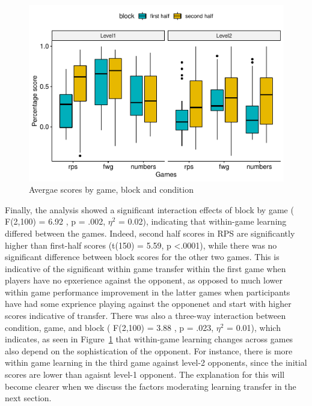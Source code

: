 \documentclass[man,floatsintext]{apa6}
\begin{document}
\begin{figure}

{\centering \includegraphics{draft_report_v1_files/figure-latex/exp1-3factor-plot-1} 

}

\caption{Avergae scores by game, block and condition}\label{fig:exp1-3factor-plot}
\end{figure}

Finally, the analysis showed a significant interaction effects of block by game ( F(2,100) = 6.92 , p = .002, \(\eta^{2}\) = 0.02), indicating that within-game learning differed between the games. Indeed, second half scores in RPS are significantly higher than first-half scores (t(150) = 5.59, p \textless{}.0001), while there was no significant difference between block scores for the other two games. This is indicative of the significant within game transfer within the first game when players have no epxerience against the opponent, as opposed to much lower within game performance improvement in the latter games when participants have had some exprience playing against the opponenet and start with higher scores indicative of transfer. There was also a three-way interaction between condition, game, and block ( F(2,100) = 3.88 , p = .023, \(\eta^{2}\) = 0.01), which indicates, as seen in Figure~\ref{fig:exp1-3factor-plot} that within-game learning changes across games also depend on the sophistication of the opponent. For instance, there is more within game learning in the third game against level-2 opponents, since the initial scores are lower than agaisnt level-1 opponent. The explanation for this will become clearer when we discuss the factors moderating learning transfer in the next section.
\end{document}
